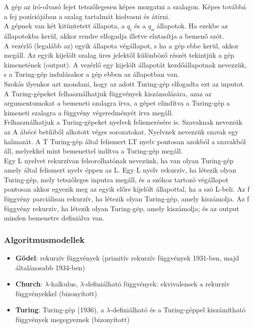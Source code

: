 \documentclass[tikz,12pt,margin=0px]{article}
\begin{document}
    \noindent A gép az író-olvasó fejet tetszőlegesen képes mozgatni a szalagon. Képes továbbá a fej pozíciójában a szalag tartalmát kiolvasni és átírni. \\

    \noindent A gépnek van két kitüntetett állapota, a $q_{i}$ és a $q_{n}$ állapotok. Ha ezekbe az állapotokba kerül, akkor rendre elfogadja illetve elutasítja a bemenő szót. \\

    \noindent A vezérlő (legalább az) egyik állapota végállapot, s ha a gép ebbe kerül, akkor megáll. Az egyik kijelölt szalag üres jelektől különböző részét tekintjük a gép kimenetének (output). A vezérlő egy kijelölt állapotát kezdőállapotnak nevezzük, s a Turing-gép indulásakor a gép ebben az állapotban van.\\


    \noindent Szokás ilyenkor azt mondani, hogy az adott Turing-gép elfogadta ezt az inputot. A Turing-gépeket felhasználhatjuk függvények kiszámolására, azaz az argumentumokat a bemeneti szalagra írva, a gépet elindítva a Turing-gép a kimeneti szalagra a függvény végeredményét írva megáll.\\

    \noindent Felhasználhatjuk a Turing-gépeket nyelvek felismerésére is. Szavaknak nevezzük az A ábécé betűiből alkotott véges sorozatokat. Nyelvnek nevezzük szavak egy halmazát. A T Turing-gép által felismert LT nyelv pontosan azokból a szavakból áll, melyekkel mint bemenettel indítva a Turing-gép megáll.\\

    \noindent Egy L nyelvet rekurzívan felsorolhatónak nevezünk, ha van olyan Turing-gép amely által felismert nyelv éppen az L. Egy L nyelv rekurzív, ha létezik olyan Turing-gép, mely tetszőleges inputra megáll, és a szóhoz tartozó végállapot pontosan akkor egyezik meg az egyik előre kijelölt állapottal, ha a szó L-beli. Az f függvény parciálisan rekurzív, ha létezik olyan Turing-gép, amely kiszámolja. Az f függvény rekurzív, ha létezik olyan Turing-gép, amely kiszámolja; és az output minden bemenetre definiálva van.
	
	\subsubsection*{Algoritmusmodellek}
	
	\begin{itemize}
		\item	\textbf{Gödel}: rekurzív függvények (primitív rekurzív függvények 1931-ben, majd általánosabb 1934-ben)
		\item	\textbf{Church}: $\lambda$-kalkulus, $\lambda$-definiálható függvények: ekvivalensek a rekurzív függvényekkel (bizonyított)
		\item	\textbf{Turing}: Turing-gép (1936), a $\lambda$-definiálható és a Turing-géppel kiszámítható függvények megegyeznek (bizonyított)
	\end{itemize}
	
\end{document}
